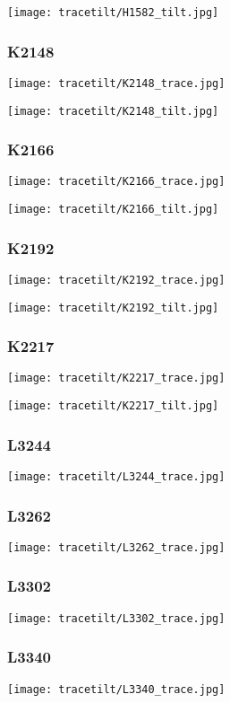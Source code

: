 \texttt{[image: tracetilt/H1582\_tilt.jpg]}

\subsubsection{K2148}
\texttt{[image: tracetilt/K2148\_trace.jpg]}

\texttt{[image: tracetilt/K2148\_tilt.jpg]}

\subsubsection{K2166}
\texttt{[image: tracetilt/K2166\_trace.jpg]}

\texttt{[image: tracetilt/K2166\_tilt.jpg]}

\subsubsection{K2192}
\texttt{[image: tracetilt/K2192\_trace.jpg]}

\texttt{[image: tracetilt/K2192\_tilt.jpg]}

\subsubsection{K2217}
\texttt{[image: tracetilt/K2217\_trace.jpg]}

\texttt{[image: tracetilt/K2217\_tilt.jpg]}

\subsubsection{L3244}
\texttt{[image: tracetilt/L3244\_trace.jpg]}
\subsubsection{L3262}
\texttt{[image: tracetilt/L3262\_trace.jpg]}
\subsubsection{L3302}
\texttt{[image: tracetilt/L3302\_trace.jpg]}
\subsubsection{L3340}
\texttt{[image: tracetilt/L3340\_trace.jpg]}
